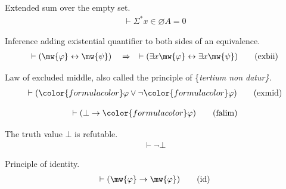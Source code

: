\begin{lemma} {Extended sum over the empty set.} 
\begin{align}
\vdash \Sigma^{*} x \in \varnothing A = 0
\label{eq:esumnul}\tag{esumnul}
\end{align}
\end{lemma}


\begin{lemma} Inference adding existential quantifier to
both sides of an equivalence.
\begin{align}
\vdash ( \mw{\varphi} \leftrightarrow \mw{\psi} )\quad\Rightarrow\quad \vdash (
    \exists x \mw{\varphi} \leftrightarrow \exists x \mw{\psi}
    )\label{eq:exbii}\tag{exbii}
\end{align}
\end{lemma}


\begin{lemma} {Law of excluded middle}, also called the
principle of \{\em tertium non datur\}.
\begin{align}
\vdash ( {\color{formulacolor}\varphi} \vee \lnot {\color{formulacolor}\varphi}
    )\label{eq:exmid}\tag{exmid}
\end{align}
\end{lemma}


\begin{lemma}
\begin{align}
\vdash ( \bot \rightarrow {\color{formulacolor}\varphi} )\label{eq:falim}\tag{falim}
\end{align}
\end{lemma}


\begin{lemma} {The truth value $\bot$ is refutable.} 
\begin{align}
\vdash \lnot \bot\label{eq:fal}\tag{fal}
\end{align}
\end{lemma}


\begin{lemma} Principle of identity.  
\begin{align}
\vdash ( \mw{\varphi} \rightarrow \mw{\varphi} )\label{eq:id}\tag{id}
\end{align}
\end{lemma}


